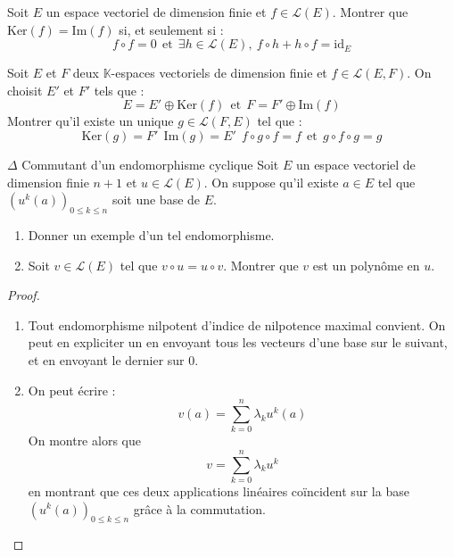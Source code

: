 \documentclass[french,a4paper]{article}
\newcommand{\K}{\mathbb{K}}
\renewcommand{\ker}{\text{Ker}}
\theoremstyle{plain}
\theoremstyle{definition}
\theoremstyle{remark}
\begin{document}
\begin{ex}[Moulin.38]{}
	Soit $E$ un espace vectoriel de dimension finie et $f\in\mathcal{L}(E)$. Montrer que $\ker(f)=\text{Im}(f)$ si, et seulement si : $$f\circ f=0\ \ \text{et}\ \ \exists h\in\mathcal{L}(E),\ f\circ h+h\circ f=\text{id}_E$$
\end{ex}

\begin{ex}[Moulin.39]{}
	Soit $E$ et $F$ deux $\K$-espaces vectoriels de dimension finie et $f\in\mathcal{L}(E,F)$. On choisit $E'$ et $F'$ tels que : $$E=E'\oplus\ker(f)\ \ \text{et}\ \ F=F'\oplus\text{Im}(f)$$ Montrer qu'il existe un unique $g\in\mathcal{L}(F,E)$ tel que : $$\ker(g)=F'\ \ \text{Im}(g)=E'\ \ f\circ g\circ f=f\ \ \text{et}\ \ g\circ f\circ g=g$$
\end{ex}

\begin{ex}[Moulin.40]{$\Delta$ Commutant d'un endomorphisme cyclique}
	Soit $E$ un espace vectoriel de dimension finie $n+1$ et $u\in\mathcal{L}(E)$. On suppose qu'il existe $a\in E$ tel que $\left(u^k(a)\right)_{0\leqslant k\leqslant n}$ soit une base de $E$.
	\begin{enumerate}
		\item Donner un exemple d'un tel endomorphisme.
		\item Soit $v\in \mathcal{L}(E)$ tel que $v\circ u=u\circ v$. Montrer que $v$ est un polynôme en $u$.
	\end{enumerate}
\end{ex}
\begin{proof}
	\begin{enumerate}
		\item Tout endomorphisme nilpotent d'indice de nilpotence maximal convient. On peut en expliciter un en envoyant tous les vecteurs d'une base sur le suivant, et en envoyant le dernier sur $0$.
		\item On peut écrire : $$v(a)=\sum_{k=0}^{n}\lambda_ku^k(a)$$ On montre alors que $$v=\sum_{k=0}^{n}\lambda_k u^k$$ en montrant que ces deux applications linéaires coïncident sur la base $\left(u^k(a)\right)_{0\leqslant k\leqslant n}$ grâce à la commutation.
	\end{enumerate}
\end{proof}
\end{document}
